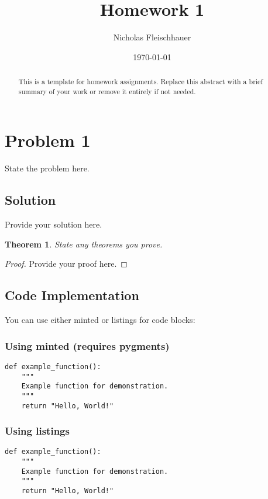 \documentclass[11pt, a4paper, oneside]{article}
\title{Homework 1}
\author{Nicholas Fleischhauer}
\date{\today}
\newtheorem{theorem}{Theorem}
\begin{document}
\maketitle

\begin{abstract}
  This is a template for homework assignments. Replace this abstract with a brief summary of your work or remove it entirely if not needed.
\end{abstract}

\section{Problem 1}

State the problem here.

\subsection{Solution}

Provide your solution here.

\begin{theorem}
  State any theorems you prove.
\end{theorem}

\begin{proof}
  Provide your proof here.
\end{proof}

\subsection{Code Implementation}

You can use either minted or listings for code blocks:

\subsubsection{Using minted (requires pygments)}

\begin{verbatim}
def example_function():
    """
    Example function for demonstration.
    """
    return "Hello, World!"
\end{verbatim}

\subsubsection{Using listings}

\begin{lstlisting}[caption={Example Python Code}, label={lst:example}]
def example_function():
    """
    Example function for demonstration.
    """
    return "Hello, World!"
\end{lstlisting}
\end{document}
